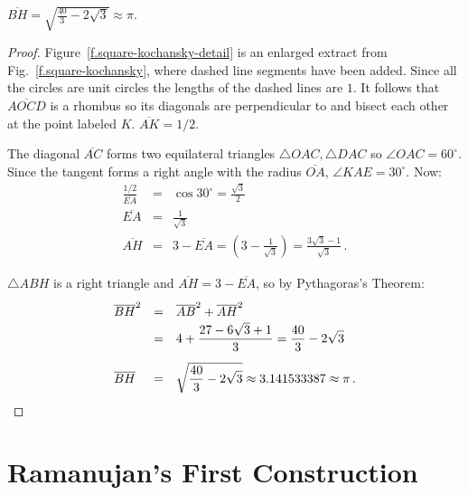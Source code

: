 \begin{theorem}
$\overline{BH}=\sqrt{\displaystyle\frac{40}{3}-2\sqrt{3}}\approx \pi$.
\end{theorem}
\begin{proof}
Figure~\ref{f.square-kochansky-detail} is an enlarged extract from Fig.~\ref{f.square-kochansky}, where dashed line segments have been added. Since all the circles are unit circles the lengths of the dashed lines are $1$. It follows that  $\overline{AOCD}$ is a rhombus so its diagonals are perpendicular to and bisect each other at the point labeled $K$. $\overline{AK}=1/2$.

\newpage

The diagonal $\overline{AC}$ forms two equilateral triangles $\triangle OAC, \triangle DAC$ so $\angle OAC=60^\circ$. Since the tangent forms a right angle with the radius $\overline{OA}$, $\angle KAE=30^\circ$. Now:
\begin{displaymath}
\renewcommand{\arraystretch}{1.5}
\begin{array}{lcl}
\displaystyle\frac{1/2}{\overline{EA}}&=&
\cos 30^\circ=\displaystyle\frac{\sqrt{3}}{2}\\
\overline{EA}&=&\displaystyle\frac{1}{\sqrt{3}}\\
\overline{AH}&=&3-\overline{EA}=\left(3-\displaystyle\frac{1}{\sqrt{3}}\right)
=\displaystyle\frac{3\sqrt{3}-1}{\sqrt{3}}\,.
\end{array}
\end{displaymath}

$\triangle ABH$ is a right triangle and $\overline{AH}=3-\overline{EA}$, so by Pythagoras's Theorem:
\begin{displaymath}
\renewcommand{\arraystretch}{1.5}
\begin{array}{lcl}
\overline{BH}^2&=&\overline{AB}^2+\overline{AH}^2\\
&=&4+\displaystyle\frac{27 -6\sqrt{3}+1}{3}=\frac{40}{3}-2\sqrt{3}\\
\overline{BH}&=&\rule{0pt}{25pt}\sqrt{\displaystyle\frac{40}{3}-2\sqrt{3}}\approx 3.141533387\approx \pi\,.
\end{array}
\end{displaymath}
\end{proof}


\newpage

\section{Ramanujan's First Construction}\label{s.square-ramanujan-first}

